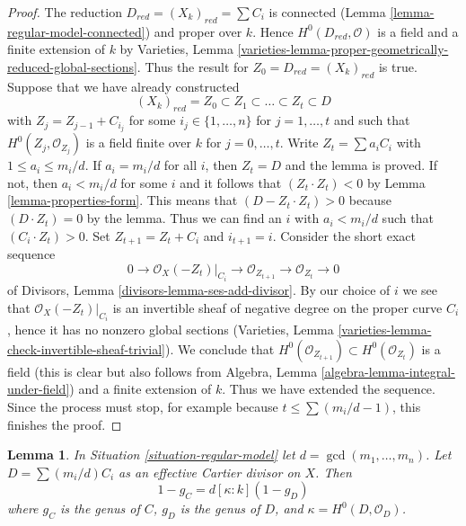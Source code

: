 \documentclass{stacks-project}
\newenvironment{reference}{\comment}{\endcomment}
\theoremstyle{plain}
\newtheorem{lemma}[subsection]{Lemma}
\theoremstyle{definition}
\theoremstyle{remark}
\numberwithin{equation}{subsection}
\begin{document}
\begin{proof}
The reduction $D_{red} = (X_k)_{red} = \sum C_i$ is connected
(Lemma \ref{lemma-regular-model-connected}) and proper over $k$. Hence
$H^0(D_{red}, \mathcal{O})$ is a field and a finite extension of
$k$ by Varieties, Lemma
\ref{varieties-lemma-proper-geometrically-reduced-global-sections}.
Thus the result for $Z_0 = D_{red} = (X_k)_{red}$ is true.
Suppose that we have already constructed
$$
(X_k)_{red} = Z_0 \subset Z_1 \subset \ldots \subset Z_t \subset D
$$
with $Z_j = Z_{j - 1} + C_{i_j}$ for some $i_j \in \{1, \ldots, n\}$
for $j = 1, \ldots, t$ and such that $H^0(Z_j, \mathcal{O}_{Z_j})$
is a field finite over $k$ for $j = 0, \ldots, t$.
Write $Z_t = \sum a_i C_i$ with $1 \leq a_i \leq m_i/d$.
If $a_i = m_i/d$ for all $i$, then $Z_t = D$ and the lemma is proved.
If not, then $a_i < m_i/d$ for some $i$ and it follows that
$(Z_t \cdot Z_t) < 0$ by Lemma \ref{lemma-properties-form}. This means that
$(D - Z_t \cdot Z_t) > 0$ because $(D \cdot Z_t) = 0$ by the lemma.
Thus we can find an $i$ with $a_i < m_i/d$ such that
$(C_i \cdot Z_t) > 0$. Set $Z_{t + 1} = Z_t + C_i$ and $i_{t + 1} = i$.
Consider the short exact sequence
$$
0 \to \mathcal{O}_X(-Z_t)|_{C_i} \to \mathcal{O}_{Z_{t + 1}} \to
\mathcal{O}_{Z_t} \to 0
$$
of Divisors, Lemma \ref{divisors-lemma-ses-add-divisor}.
By our choice of $i$ we see that
$\mathcal{O}_X(-Z_t)|_{C_i}$ is an invertible sheaf of negative degree
on the proper curve $C_i$, hence it has no nonzero global sections
(Varieties, Lemma \ref{varieties-lemma-check-invertible-sheaf-trivial}).
We conclude that $H^0(\mathcal{O}_{Z_{t + 1}}) \subset H^0(\mathcal{O}_{Z_t})$
is a field (this is clear but also follows from
Algebra, Lemma \ref{algebra-lemma-integral-under-field})
and a finite extension of $k$. Thus we have extended the sequence.
Since the process must stop, for example because $t \leq \sum (m_i/d - 1)$,
this finishes the proof.
\end{proof}

\begin{lemma}
\label{lemma-regular-model-genus}
\begin{reference}
\cite[Lemma 2.6]{Artin-Winters}
\end{reference}
In Situation \ref{situation-regular-model} let $d = \gcd(m_1, \ldots, m_n)$.
Let $D = \sum (m_i/d) C_i$ as an effective Cartier divisor on $X$. Then
$$
1 - g_C = d [\kappa : k] (1 - g_D)
$$
where $g_C$ is the genus of $C$, $g_D$ is the genus of $D$, and
$\kappa = H^0(D, \mathcal{O}_D)$.
\end{lemma}
\end{document}
